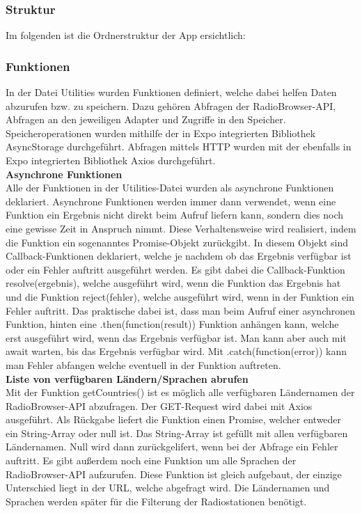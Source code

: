 \documentclass[11pt, twoside]{article}
\begin{document}
\subsubsection{Struktur}
Im folgenden ist die Ordnerstruktur der App ersichtlich:

\subsubsection{Funktionen}
In der Datei Utilities wurden Funktionen definiert, welche dabei helfen Daten abzurufen bzw. zu speichern. Dazu gehören Abfragen der RadioBrowser-API, Abfragen an den jeweiligen Adapter und Zugriffe in den Speicher. Speicheroperationen wurden mithilfe der in Expo integrierten Bibliothek \glqq AsyncStorage \grqq{}  durchgeführt. Abfragen mittels HTTP wurden mit der ebenfalls in Expo integrierten Bibliothek \glqq Axios \grqq{} durchgeführt. \newline \\
\textbf{Asynchrone Funktionen} \\
Alle der Funktionen in der Utilities-Datei wurden als asynchrone Funktionen deklariert. Asynchrone Funktionen werden immer dann verwendet, wenn eine Funktion ein Ergebnis nicht direkt beim Aufruf liefern kann, sondern dies noch eine gewisse Zeit in Anspruch nimmt. Diese Verhaltensweise wird realisiert, indem die Funktion ein sogenanntes Promise-Objekt zurückgibt. In diesem Objekt sind Callback-Funktionen deklariert, welche je nachdem ob das Ergebnis verfügbar ist oder ein Fehler auftritt ausgeführt werden. Es gibt dabei die Callback-Funktion resolve(ergebnis), welche ausgeführt wird, wenn die Funktion das Ergebnis hat und die Funktion reject(fehler), welche ausgeführt wird, wenn in der Funktion ein Fehler auftritt. Das praktische dabei ist, dass man beim Aufruf einer asynchronen Funktion, hinten eine .then(function(result)) Funktion anhängen kann, welche erst ausgeführt wird, wenn das Ergebnis verfügbar ist. Man kann aber auch mit await warten, bis das Ergebnis verfügbar wird. Mit .catch(function(error)) kann man Fehler abfangen welche eventuell in der Funktion auftreten. \newline \\
\textbf{Liste von verfügbaren Ländern/Sprachen abrufen} \\
Mit der Funktion getCountries() ist es möglich alle verfügbaren Ländernamen der RadioBrowser-API abzufragen. Der GET-Request wird dabei mit Axios ausgeführt. Als Rückgabe liefert die Funktion einen Promise, welcher entweder ein String-Array oder null ist. Das String-Array ist gefüllt mit allen verfügbaren Ländernamen. Null wird dann zurückgelifert, wenn bei der Abfrage ein Fehler auftritt. Es gibt außerdem noch eine Funktion um alle Sprachen der RadioBrowser-API aufzurufen. Diese Funktion ist gleich aufgebaut, der einzige Unterschied liegt in der URL, welche abgefragt wird. Die Ländernamen und Sprachen werden später für die Filterung der Radiostationen benötigt. \newline \\
\end{document}
